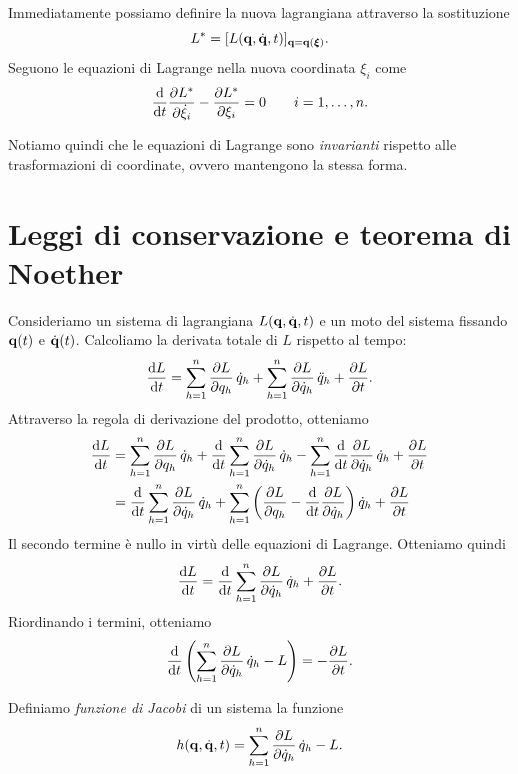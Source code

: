 Immediatamente possiamo definire la nuova lagrangiana attraverso la sostituzione
\begin{equation*}
    L^* = [L(\vb{q}, \dot{\vb{q}}, t)]_{\vb{q} = \vb{q}(\vb*{\xi})}.
\end{equation*}
Seguono le equazioni di Lagrange nella nuova coordinata $\xi_i$ come
\begin{equation*}
    \dv{t}\pdv{L^*}{\dot{\xi}_i} - \pdv{L^*}{\xi_i} = 0 \qquad i = 1, \dots, n.
\end{equation*}

Notiamo quindi che le equazioni di Lagrange sono \emph{invarianti} rispetto alle trasformazioni di coordinate, ovvero mantengono la stessa forma.

\section{Leggi di conservazione e teorema di Noether}

Consideriamo un sistema di lagrangiana $L(\vb{q}, \dot{\vb{q}}, t)$ e un moto del sistema fissando $\vb{q}(t)$ e $\dot{\vb{q}}(t)$. Calcoliamo la derivata totale di $L$ rispetto al tempo:
\begin{equation*}
    \dv{L}{t} = \sum_{h=1}^n \pdv{L}{q_h}\,\dot{q}_h + \sum_{h=1}^n \pdv{L}{\dot{q}_h}\,\ddot{q}_h + \pdv{L}{t}.
\end{equation*}
Attraverso la regola di derivazione del prodotto, otteniamo
\begin{align*}
    \dv{L}{t} &= \sum_{h=1}^n \pdv{L}{q_h}\,\dot{q}_h + \dv{t}\sum_{h=1}^n \pdv{L}{\dot{q}_h}\,\dot{q}_h - \sum_{h=1}^n \dv{t}\pdv{L}{\dot{q}_h}\,\dot{q}_h + \pdv{L}{t} \\
    &= \dv{t} \sum_{h=1}^n \pdv{L}{\dot{q}_h}\,\dot{q}_h + \sum_{h=1}^n \left(\pdv{L}{q_h} - \dv{t}\pdv{L}{\dot{q}_h}\right)\dot{q}_h + \pdv{L}{t} \\
\end{align*}
Il secondo termine è nullo in virtù delle equazioni di Lagrange. Otteniamo quindi
\begin{equation*}
    \dv{L}{t} = \dv{t} \sum_{h=1}^n \pdv{L}{\dot{q}_h}\,\dot{q}_h + \pdv{L}{t}.
\end{equation*}
Riordinando i termini, otteniamo
\begin{equation}
    \label{eq:conservazione_H}
    \dv{t}\left(\sum_{h=1}^n \pdv{L}{\dot{q}_h}\,\dot{q}_h - L\right) = -\pdv{L}{t}.
\end{equation}

\begin{definition}
    Definiamo \emph{funzione di Jacobi} di un sistema la funzione
    \begin{equation*}
        h(\vb{q}, \dot{\vb{q}}, t) = \sum_{h=1}^n \pdv{L}{\dot{q}_h}\,\dot{q}_h - L.
    \end{equation*}
\end{definition}

